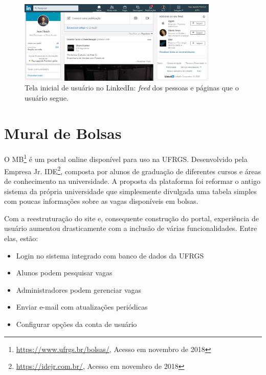 \documentclass[cic,tc]{iiufrgs}
\begin{document}
\begin{figure}[h]
    \caption{Tela inicial de usuário no LinkedIn: \textit{feed} dos pessoas e páginas que o usuário segue.}
        \begin{center}
            \includegraphics[width=0.85\textwidth]{figuras/rel05.png}
        \end{center}
    \label{telaHomeLKDIN}
\end{figure}

\section{Mural de Bolsas}
\label{trabRelMDB}

O MB\footnote{{\url{https://www.ufrgs.br/bolsas/}, Acesso em novembro de 2018}} é um portal online disponível para uso na UFRGS. Desenvolvido pela Empresa Jr. IDE\footnote{{\url{https://idejr.com.br/}, Acesso em novembro de 2018}}, composta por alunos de graduação de diferentes cursos e áreas de conhecimento na universidade. A proposta da plataforma foi reformar o antigo sistema da própria universidade que simplesmente divulgada uma tabela simples com poucas informações sobre as vagas disponíveis em bolsas. 

Com a reestruturação do site e, consequente construção do portal, experiência de usuário aumentou drasticamente  com a inclusão de várias funcionalidades. Entre elas, estão:
\begin{itemize}
    \item Login no sistema integrado com banco de dados da UFRGS
    \item Alunos podem pesquisar vagas
    \item Administradores podem gerenciar vagas
    \item Enviar e-mail com atualizações periódicas
    \item Configurar opções da conta de usuário
\end{itemize}
\end{document}

